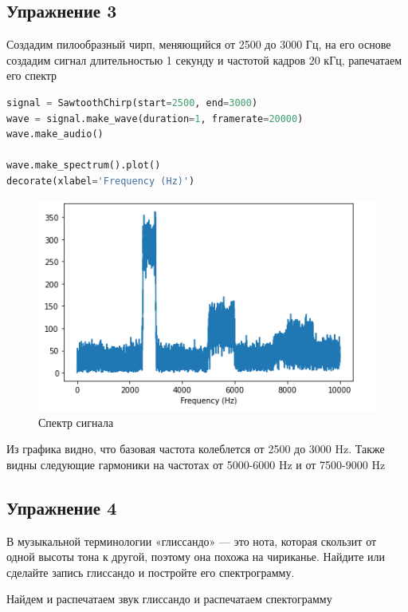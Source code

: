 \subsection{Упражнение 3}

Создадим пилообразный чирп, меняющийся от 2500 до 3000 Гц, на его основе создадим сигнал длительностью 1 секунду и частотой кадров 20 кГц, рапечатаем его спектр

\begin{lstlisting}[language=Python]
signal = SawtoothChirp(start=2500, end=3000)
wave = signal.make_wave(duration=1, framerate=20000)
wave.make_audio()

wave.make_spectrum().plot()
decorate(xlabel='Frequency (Hz)')
\end{lstlisting}

\begin{figure}[H]
	\begin{center}
		\includegraphics[scale=1]{fig/lab03/lab03_11.png}
		\caption{Спектр сигнала}
	\end{center}
\end{figure}

Из графика видно, что базовая частота колеблется от 2500 до 3000 Hz. Также видны следующие гармоники на частотах от 5000-6000 Hz и от 7500-9000 Hz

\subsection{Упражнение 4}

В музыкальной терминологии «глиссандо» — это нота, которая скользит от одной высоты тона к другой, поэтому она похожа на чириканье. Найдите или сделайте запись глиссандо и постройте его спектрограмму.

Найдем и распечатаем звук глиссандо и распечатаем спектограмму

